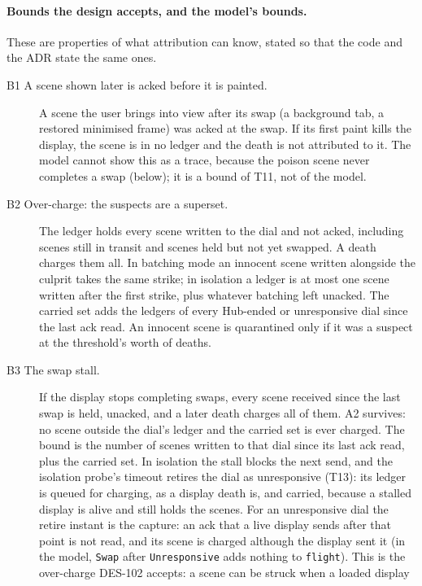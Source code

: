 \documentclass[a4paper,10pt,fleqn]{article}
\begin{document}
\paragraph{Bounds the design accepts, and the model's bounds.}
These are properties of what attribution can know, stated so that the code and
the ADR state the same ones.
\begin{description}
  \item[B1  A scene shown later is acked before it is painted.]  A scene the user
    brings into view after its swap (a background tab, a restored minimised
    frame) was acked at the swap.  If its first paint kills the display, the
    scene is in no ledger and the death is not attributed to it.  The model
    cannot show this as a trace, because the poison scene never completes a swap
    (below); it is a bound of T11, not of the model.
  \item[B2  Over-charge: the suspects are a superset.]  The ledger holds every
    scene written to the dial and not acked, including scenes still in transit and
    scenes held but not yet swapped.  A death charges them all.  In batching mode
    an innocent scene written alongside the culprit takes the same strike; in
    isolation a ledger is at most one scene written after the first strike, plus
    whatever batching left unacked.  The carried set adds the ledgers of every
    Hub-ended or unresponsive dial since the last ack read.  An innocent scene is quarantined
    only if it was a suspect at the threshold's worth of deaths.
  \item[B3  The swap stall.]  If the display stops completing swaps, every scene
    received since the last swap is held, unacked, and a later death charges
    all of them.  A2 survives: no scene outside the dial's ledger and the
    carried set is ever charged.  The bound is the number of scenes written to
    that dial since its last ack read, plus the carried set.  In isolation the
    stall blocks the next send, and the isolation probe's timeout retires the dial
    as unresponsive (T13): its ledger is queued for charging, as a display death
    is, and carried, because a stalled display is alive and still holds the
    scenes.  For an unresponsive dial the retire instant is the capture: an ack
    that a live display sends after that point is not read, and its scene is
    charged although the display sent it (in the model, \texttt{Swap} after
    \texttt{Unresponsive} adds nothing to \texttt{flight}).  This is the
    over-charge DES-102 accepts: a scene can be struck when a loaded display

\end{description}
\end{document}
